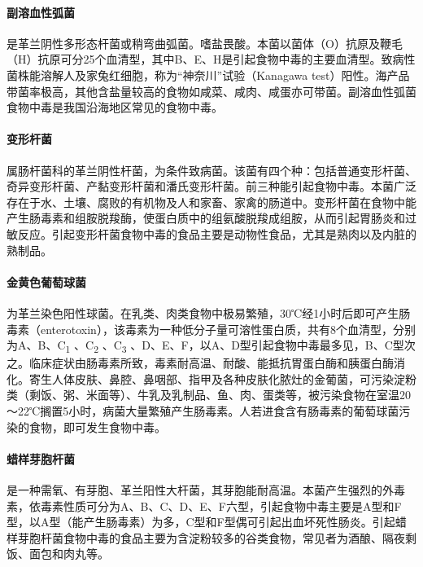 \paragraph{副溶血性弧菌}

是革兰阴性多形态杆菌或稍弯曲弧菌。嗜盐畏酸。本菌以菌体（O）抗原及鞭毛（H）抗原可分25个血清型，其中B、E、H是引起食物中毒的主要血清型。致病性菌株能溶解人及家兔红细胞，称为“神奈川”试验（Kanagawa
test）阳性。海产品带菌率极高，其他含盐量较高的食物如咸菜、咸肉、咸蛋亦可带菌。副溶血性弧菌食物中毒是我国沿海地区常见的食物中毒。

\paragraph{变形杆菌}

属肠杆菌科的革兰阴性杆菌，为条件致病菌。该菌有四个种：包括普通变形杆菌、奇异变形杆菌、产黏变形杆菌和潘氏变形杆菌。前三种能引起食物中毒。本菌广泛存在于水、土壤、腐败的有机物及人和家畜、家禽的肠道中。变形杆菌在食物中能产生肠毒素和组胺脱羧酶，使蛋白质中的组氨酸脱羧成组胺，从而引起胃肠炎和过敏反应。引起变形杆菌食物中毒的食品主要是动物性食品，尤其是熟肉以及内脏的熟制品。

\paragraph{金黄色葡萄球菌}

为革兰染色阳性球菌。在乳类、肉类食物中极易繁殖，30℃经1小时后即可产生肠毒素（enterotoxin），该毒素为一种低分子量可溶性蛋白质，共有8个血清型，分别为A、B、C\textsubscript{1}
、C\textsubscript{2} 、C\textsubscript{3}
、D、E、F，以A、D型引起食物中毒最多见，B、C型次之。临床症状由肠毒素所致，毒素耐高温、耐酸、能抵抗胃蛋白酶和胰蛋白酶消化。寄生人体皮肤、鼻腔、鼻咽部、指甲及各种皮肤化脓灶的金葡菌，可污染淀粉类（剩饭、粥、米面等）、牛乳及乳制品、鱼、肉、蛋类等，被污染食物在室温20～22℃搁置5小时，病菌大量繁殖产生肠毒素。人若进食含有肠毒素的葡萄球菌污染的食物，即可发生食物中毒。

\paragraph{蜡样芽胞杆菌}

是一种需氧、有芽胞、革兰阳性大杆菌，其芽胞能耐高温。本菌产生强烈的外毒素，依毒素性质可分为A、B、C、D、E、F六型，引起食物中毒主要是A型和F型，以A型（能产生肠毒素）为多，C型和F型偶可引起出血坏死性肠炎。引起蜡样芽胞杆菌食物中毒的食品主要为含淀粉较多的谷类食物，常见者为酒酿、隔夜剩饭、面包和肉丸等。

